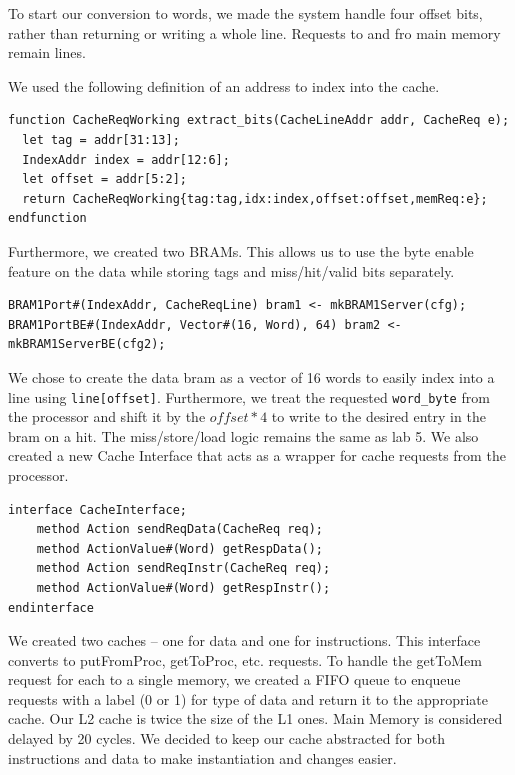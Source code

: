 \documentclass{article}
\begin{document}
To start our conversion to words, we made the system handle four offset bits, rather than returning or writing a whole line. Requests to and fro main memory remain lines.

We used the following definition of an address to index into the cache. 
\begin{lstlisting}
function CacheReqWorking extract_bits(CacheLineAddr addr, CacheReq e);
  let tag = addr[31:13];
  IndexAddr index = addr[12:6];
  let offset = addr[5:2];
  return CacheReqWorking{tag:tag,idx:index,offset:offset,memReq:e};
endfunction
\end{lstlisting}
Furthermore, we created two BRAMs. This allows us to use the byte enable feature on the data while storing tags and miss/hit/valid bits separately. 
\begin{lstlisting}
BRAM1Port#(IndexAddr, CacheReqLine) bram1 <- mkBRAM1Server(cfg);
BRAM1PortBE#(IndexAddr, Vector#(16, Word), 64) bram2 <- mkBRAM1ServerBE(cfg2);
\end{lstlisting}

We chose to create the data bram as a vector of 16 words to easily index into a line using \lstinline|line[offset]|. Furthermore, we treat the requested \lstinline{word_byte} from the processor and shift it by the $offset*4$ to write to the desired entry in the bram on a hit.  The miss/store/load logic remains the same as lab 5. We also created a new Cache Interface that acts as a wrapper for cache requests from the processor.

\begin{lstlisting}
interface CacheInterface;
    method Action sendReqData(CacheReq req);
    method ActionValue#(Word) getRespData();
    method Action sendReqInstr(CacheReq req);
    method ActionValue#(Word) getRespInstr();
endinterface
\end{lstlisting}

We created two caches -- one for data and one for instructions. This interface converts to putFromProc, getToProc, etc. requests. To handle the getToMem request for each to a single memory, we created a FIFO queue to enqueue requests with a label (0 or 1) for type of data and return it to the appropriate cache. Our L2 cache is twice the size of the L1 ones. Main Memory is considered delayed by 20 cycles. We decided to keep our cache abstracted for both instructions and data to make instantiation and changes easier.
\end{document}
